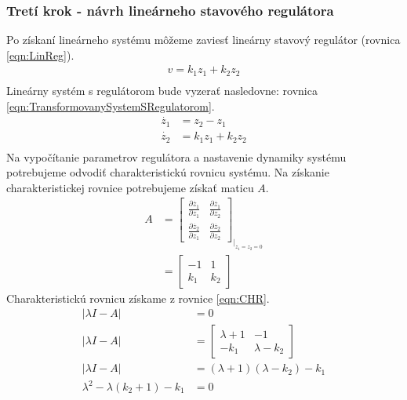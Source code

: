 \documentclass[../main.tex]{subfiles}
\begin{document}
\subsubsection{Tretí krok - návrh lineárneho stavového regulátora}
Po získaní lineárneho systému môžeme zaviesť lineárny stavový regulátor (rovnica \ref{eqn:LinReg}).
\begin{equation}
	\begin{split}
		v = k_1z_1 + k_2z_2 \\
	\end{split}
	\label{eqn:LinReg}
\end{equation}
Lineárny systém s regulátorom bude vyzerať nasledovne: rovnica \ref{eqn:TransformovanySystemSRegulatorom}. 
\begin{equation}
	\begin{aligned}
	\dot{z_1}  & = z_2 - z_1 \\
	 \dot{z_2} & = k_1z_1 + k_2z_2 \\
	\end{aligned}
	\label{eqn:TransformovanySystemSRegulatorom}
\end{equation}
Na vypočítanie parametrov regulátora a nastavenie dynamiky systému potrebujeme odvodiť charakteristickú rovnicu systému.
Na získanie charakteristickej rovnice potrebujeme získať maticu $A$.
\begin{equation}
\begin{aligned} 
 A  & = \begin{bmatrix} \frac{\partial \dot{z_1}}{\partial z_1}& \frac{\partial \dot{z_1}}{\partial z_2}\\ \frac{\partial \dot{z_2}}{\partial z_1}&\frac{\partial \dot{z_2}}{\partial z_2} \end{bmatrix}_{|_{z_1 = z_2 = 0}} \\
 & = \begin{bmatrix} -1 & 1\\ k_1 & k_2 \end{bmatrix} \
 \end{aligned}
 \label{eqn:A}
\end{equation}
Charakteristickú rovnicu získame z rovnice \ref{eqn:CHR}.
\begin{equation}
\begin{aligned} 
 |\lambda I - A| & = 0\\
|\lambda I - A| & = \begin{bmatrix} \lambda +1 & -1\\ -k_1 & \lambda -k_2 \end{bmatrix} \\
|\lambda I - A| & = (\lambda + 1)(\lambda - k_2) - k_1\\
\lambda^2 - \lambda(k_2+1) - k_1 &= 0\\ 
\end{aligned}
\label{eqn:CHR}
\end{equation}
\end{document}
